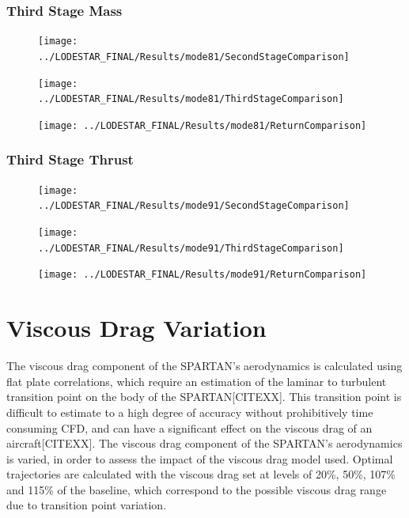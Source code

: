 \subsection{Third Stage Mass}
\begin{figure}[th]
\centering
\texttt{[image: ../LODESTAR\_FINAL/Results/mode81/SecondStageComparison]}
\caption{}
\label{fig:SecondStageComparison14}
\end{figure}

\begin{figure}[th]
\centering
\texttt{[image: ../LODESTAR\_FINAL/Results/mode81/ThirdStageComparison]}
\caption{}
\label{fig:ThirdStageComparison14}
\end{figure}



\begin{figure}[th]
	\centering
	\texttt{[image: ../LODESTAR\_FINAL/Results/mode81/ReturnComparison]}
	\caption{}
	\label{fig:ReturnComparison14}
\end{figure}

\subsection{Third Stage Thrust}

\begin{figure}[th]
\centering
\texttt{[image: ../LODESTAR\_FINAL/Results/mode91/SecondStageComparison]}
\caption{}
\label{fig:SecondStageComparison15}
\end{figure}


\begin{figure}[th]
\centering
\texttt{[image: ../LODESTAR\_FINAL/Results/mode91/ThirdStageComparison]}
\caption{}
\label{fig:ThirdStageComparison15}
\end{figure}


\begin{figure}[th]
\centering
\texttt{[image: ../LODESTAR\_FINAL/Results/mode91/ReturnComparison]}
\caption{}
\label{fig:ReturnComparison15}
\end{figure}


\chapter{Viscous Drag Variation}


The viscous drag component of the SPARTAN's aerodynamics is calculated using flat plate correlations, which require an estimation of the laminar to turbulent transition point on the body of the SPARTAN[CITEXX]. This transition point is difficult to estimate to a high degree of accuracy without prohibitively time consuming CFD, and can have a significant effect on the viscous drag of an aircraft[CITEXX].
The viscous drag component of the SPARTAN's aerodynamics is varied, in order to assess the impact of the viscous drag model used. Optimal trajectories are calculated with the viscous drag set at levels of 20\%, 50\%, 107\% and 115\% of the baseline, which correspond to the possible viscous drag range due to transition point variation.

